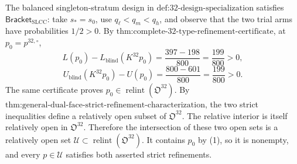 The balanced singleton-stratum design in \(\text{def:32-design-specialization}\) satisfies \(\mathsf{Bracket}_{\mathrm{SLCC}}\): take \(s_*=s_0\), use \(q_\ell<q_m<q_h\), and observe that the two trial arms have probabilities \(1/2>0\).  By \(\text{thm:complete-32-type-refinement-certificate}\), at \(p_0=p^{32,\circ}\),
\[
L(p_0)-L_{\mathrm{blind}}(K^{32}p_0)
=\frac{397-198}{800}=\frac{199}{800}>0,
\]
\[
U_{\mathrm{blind}}(K^{32}p_0)-U(p_0)
=\frac{800-601}{800}=\frac{199}{800}>0.
\tag{1}
\]
The same certificate proves \(p_0\in\operatorname{relint}(\mathfrak O^{32})\).  By \(\text{thm:general-dual-face-strict-refinement-characterization}\), the two strict inequalities define a relatively open subset of \(\mathfrak O^{32}\).  The relative interior is itself relatively open in \(\mathfrak O^{32}\).  Therefore the intersection of these two open sets is a relatively open set \(\mathcal U\subset\operatorname{relint}(\mathfrak O^{32})\).  It contains \(p_0\) by (1), so it is nonempty, and every \(p\in\mathcal U\) satisfies both asserted strict refinements.